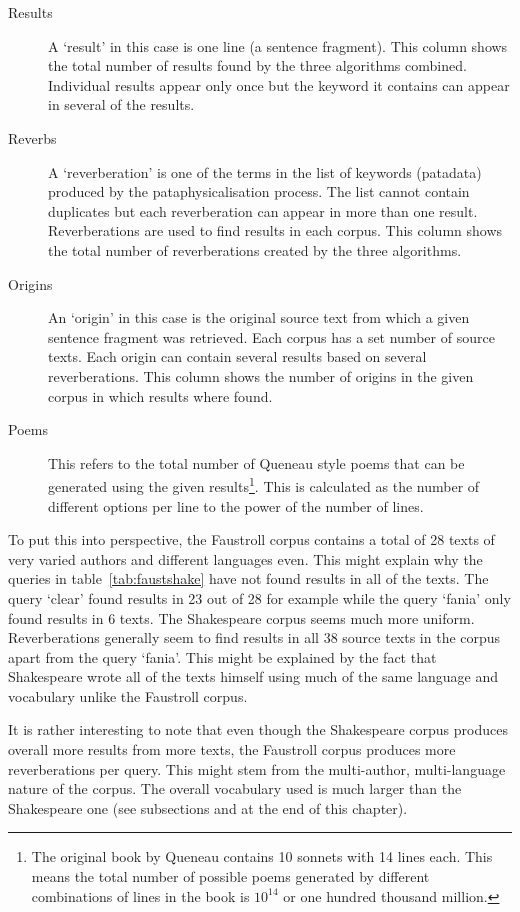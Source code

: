\begin{description}
  \item[Results] A `result' in this case is one line (a sentence fragment). This column shows the total number of results found by the three algorithms combined. Individual results appear only once but the keyword it contains can appear in several of the results.
  \item[Reverbs] A `reverberation' is one of the terms in the list of keywords (patadata) produced by the pataphysicalisation process. The list cannot contain duplicates but each reverberation can appear in more than one result. Reverberations are used to find results in each corpus. This column shows the total number of reverberations created by the three algorithms.
  \item[Origins] An `origin' in this case is the original source text from which a given sentence fragment was retrieved. Each corpus has a set number of source texts. Each origin can contain several results based on several reverberations. This column shows the number of origins in the given corpus in which results where found.
  \item[Poems] This refers to the total number of Queneau style poems that can be generated using the given results\footnote{The original book by Queneau contains 10 sonnets with 14 lines each. This means the total number of possible poems generated by different combinations of lines in the book is $10^{14}$ or one hundred thousand million.}. This is calculated as the number of different options per line to the power of the number of lines.
\end{description}

To put this into perspective, the Faustroll corpus contains a total of \num{28} texts of very varied authors and different languages even. This might explain why the queries in table~\ref{tab:faustshake} have not found results in all of the texts. The query `clear' found results in \num{23} out of \num{28} for example while the query `fania' only found results in \num{6} texts. The Shakespeare corpus seems much more uniform. Reverberations generally seem to find results in all \num{38} source texts in the corpus apart from the query `fania'. This might be explained by the fact that Shakespeare wrote all of the texts himself using much of the same language and vocabulary unlike the Faustroll corpus. 

It is rather interesting to note that even though the Shakespeare corpus produces overall more results from more texts, the Faustroll corpus produces more reverberations per query. This might stem from the multi-author, multi-language nature of the corpus. The overall vocabulary used is much larger than the Shakespeare one (see subsections  and  at the end of this chapter).

